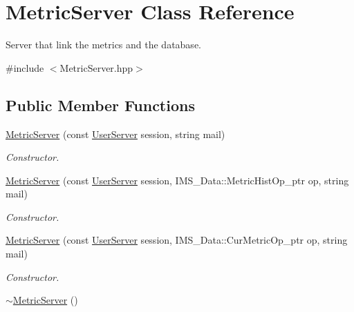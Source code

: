 \hypertarget{classMetricServer}{
\section{MetricServer Class Reference}
\label{classMetricServer}
}


Server that link the metrics and the database.  




{\ttfamily \#include $<$MetricServer.hpp$>$}

\subsection*{Public Member Functions}
\begin{DoxyCompactItemize}
\item 
\hyperlink{classMetricServer_a3e5fe73716340b9387c04834da9fe47e}{MetricServer} (const \hyperlink{classUserServer}{UserServer} session, string mail)
\begin{DoxyCompactList}\small\item\em Constructor. \item\end{DoxyCompactList}\item 
\hyperlink{classMetricServer_af0f9afbf41bb0fdc3ba06cfcb54b1ea9}{MetricServer} (const \hyperlink{classUserServer}{UserServer} session, IMS\_\-Data::MetricHistOp\_\-ptr op, string mail)
\begin{DoxyCompactList}\small\item\em Constructor. \item\end{DoxyCompactList}\item 
\hyperlink{classMetricServer_a8f865d6adad34eef1d094c8696c12ff9}{MetricServer} (const \hyperlink{classUserServer}{UserServer} session, IMS\_\-Data::CurMetricOp\_\-ptr op, string mail)
\begin{DoxyCompactList}\small\item\em Constructor. \item\end{DoxyCompactList}\item 
\hypertarget{classMetricServer_a5e4b923c808aa83fe3eb24c06cd0bfd5}{
\hyperlink{classMetricServer_a5e4b923c808aa83fe3eb24c06cd0bfd5}{$\sim$MetricServer} ()}
\label{classMetricServer_a5e4b923c808aa83fe3eb24c06cd0bfd5}


\end{DoxyCompactItemize}
